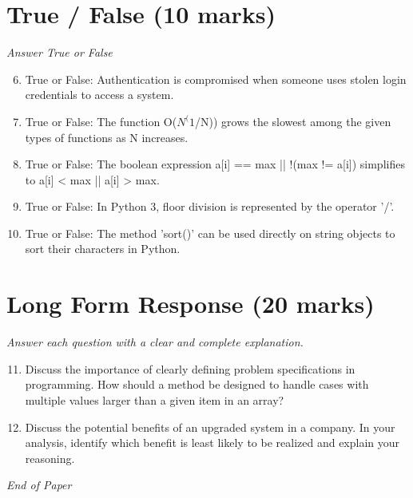\documentclass[12pt]{article}
\begin{document}
\section*{True / False (10 marks)}
\textit{Answer True or False}
\begin{enumerate}[label=\arabic*.]
\setcounter{enumi}{5}
\item True or False: Authentication is compromised when someone uses stolen login credentials to access a system.
\item True or False: The function O($N^(1$/N)) grows the slowest among the given types of functions as N increases.
\item True or False: The boolean expression a[i] == max || !(max != a[i]) simplifies to a[i] \textless{} max || a[i] \textgreater{} max.
\item True or False: In Python 3, floor division is represented by the operator '/'.
\item True or False: The method 'sort()' can be used directly on string objects to sort their characters in Python.
\end{enumerate}

\section*{Long Form Response (20 marks)}
\textit{Answer each question with a clear and complete explanation.}
\begin{enumerate}[label=\arabic*.]
\setcounter{enumi}{10}
\item Discuss the importance of clearly defining problem specifications in programming. How should a method be designed to handle cases with multiple values larger than a given item in an array?
\item Discuss the potential benefits of an upgraded system in a company. In your analysis, identify which benefit is least likely to be realized and explain your reasoning.
\end{enumerate}

\vfill
\noindent\textit{End of Paper}
\end{document}
